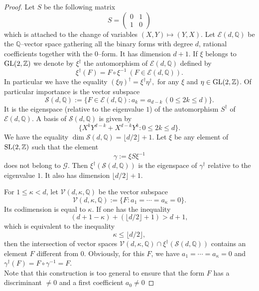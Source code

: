 \documentclass[10pt]{article}
\theoremstyle{definition}
\numberwithin{equation}{section}
\newcommand {\Q}{{\mathbb{Q}}}
\newcommand {\Z}{{\mathbb{Z}}}
\begin{document}
\begin{proof}  
Let $S$ be the following matrix 
\[
S = \begin{pmatrix}
0&1\\
1&0\end{pmatrix}
\]
which is attached to the change of variables $(X,Y) \mapsto (Y,X)$.
 Let $\mathcal E(d, \Q)$ be the $\Q$--vector space 
gathering all the binary forms with degree $d$, rational coefficients together with the $0$--form.
It has dimension $d+1$. If $\xi $ belongs to ${\rm GL} (2, \Z)$ we denote by $\xi^\dag $ the automorphism of $\mathcal E(d, \Q)$ defined by
\[
\xi^\dag (F) = F \circ \xi^{-1} \ (F \in \mathcal E(d, \Q)).
\]
In particular we have the equality $(\xi \eta)^\dag = \xi^\dag \eta^\dag,$ for any $\xi$ and $\eta \in {\rm GL}(2,\Z)$.
Of particular importance is the vector subspace 
\[
\mathcal S(d,\Q) :=\{ F \in \mathcal E(d,\Q) : a_k = a_{d-k} \, (0\leqslant 2k\leqslant d)\}.
\]
It is the eigenspace (relative to the eigenvalue $1$) of the automorphism $S^\dag $ of $\mathcal E(d,\Q)$. A basis of $ \mathcal S(d,\Q) $ is given by 
\[
\{ X^kY^{d-k} + X^{d-k}Y^k: 0\leqslant 2k \leqslant d\}.
\]
We have the equality $\dim \mathcal S(d, \Q)= \lfloor d/2\rfloor+1$. Let $\xi$ be any element of ${\rm SL}(2,\Z)$ such that the element 
\[
\gamma :=\xi S \xi^{-1}
\]
does not belong to $\mathcal G$. Then $\xi^{\dag} \left( \mathcal S(d,\Q) \right) $ is the eigenspace of $\gamma^\dag$ relative to the eigenvalue $1$. It also has dimension $\lfloor d/2\rfloor +1$.

For $1\leqslant \kappa <d$, let $\mathcal V(d, \kappa, \Q)$ be the vector subspace
\[
\mathcal V(d, \kappa, \Q):=\{ F:a_1=\cdots=a_\kappa =0 \}.
\]
Its codimension is equal to $\kappa$. If one has the inequality
\[
(d+1-\kappa) + ( \lfloor d/2\rfloor +1)> d+1,
\]
which is equivalent to the inequality
\[%
\kappa \leqslant \lfloor d/2\rfloor,
\]%
then the intersection of vector spaces $\mathcal V(d, \kappa, \Q) \cap \xi^\dag \left(\mathcal S(d,\Q)\right) $ contains an element $F$ different from $0$. Obviously, for this $F$, we have $a_1 = \cdots = a_\kappa=0$ and $ \gamma^\dag (F) = F\circ \gamma^{-1} = F$.
\\
Note that this construction is too general to ensure that the form $F$ has a discriminant $\neq 0$ and a first coefficient $a_0\neq 0$
\end{proof}
\end{document}
